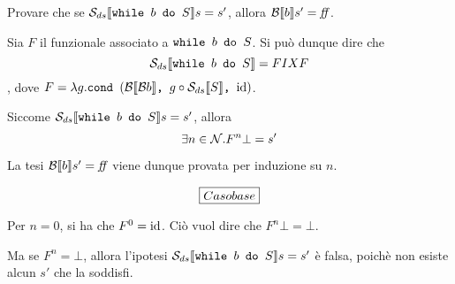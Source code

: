{
  Provare che se $\dsCtxt{\wbS{b}{S}} s = s'$, allora $\B{b}' = \semfalse$.
}
{
}

Sia $F$ il funzionale associato a $\wbS{b}{S}$. Si può dunque dire che
$$
\dsCtxt{\wbS{b}{S}} = FIX F
$$
, dove $F = \lambda{g}.\cond{\Bcal{b}}{g \circ \dsCtxt{S}}{\idDS}$.

Siccome $\dsCtxt{\wbS{b}{S}} s = s'$, allora
$$
\exists{n}\in\Ncal. F^n \bot = s'
$$

La tesi $\B{b}' = \semfalse$ viene dunque provata per induzione su $n$.

$$
\boxer{Caso base}
$$

Per $n = 0$, si ha che $F^0 = \idDS$. Ciò vuol dire che $F^n \bot = \bot$.

Ma se $F^n = \bot$, allora l'ipotesi $\dsCtxt{\wbS{b}{S}} s = s'$ è falsa,
poichè non esiste alcun $s'$ che la soddisfi.
